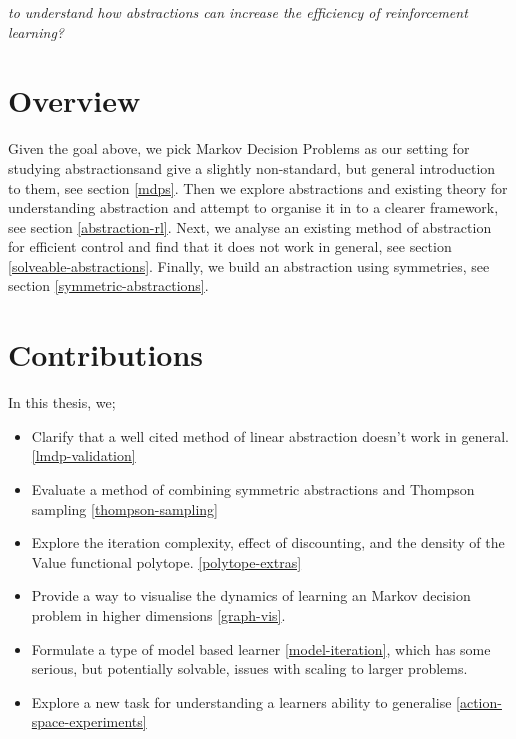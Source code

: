 \begin{displayquote}
\textit{to understand how abstractions can increase the efficiency of reinforcement learning?}
\end{displayquote}

\section{Overview}

Given the goal above, we pick Markov Decision Problems as our setting for studying abstractions\footnotemark[43] and give a slightly non-standard, but general introduction to them, see section \ref{mdps}.
Then we explore abstractions and existing theory for understanding abstraction and attempt to organise it in to a clearer framework, see section \ref{abstraction-rl}.
Next, we analyse an existing method of abstraction for efficient control and find that it does not work in general, see section \ref{solveable-abstractions}.
Finally, we build an abstraction using symmetries, see section \ref{symmetric-abstractions}.


\section{Contributions}

In this thesis, we;

\begin{itemize}
  \tightlist
  \item Clarify that a well cited method of linear abstraction doesn't work in general. \ref{lmdp-validation}
  \item Evaluate a method of combining symmetric abstractions and Thompson sampling \ref{thompson-sampling}
  \item Explore the iteration complexity, effect of discounting, and the density of the Value functional polytope. \ref{polytope-extras}
  \item Provide a way to visualise the dynamics of learning an Markov decision problem in higher dimensions \ref{graph-vis}.
  \item Formulate a type of model based learner \ref{model-iteration}, which has some serious, but potentially solvable, issues with scaling to larger problems.
  \item Explore a new task for understanding a learners ability to generalise \ref{action-space-experiments}
\end{itemize}
